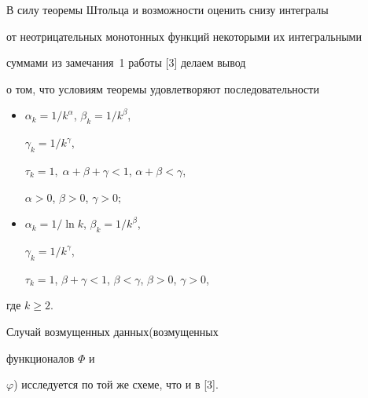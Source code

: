 \begin{note}


В силу теоремы Штольца и возможности оценить снизу интегралы


от не\-отрицательных монотонных функций некоторыми их интегральными


суммами из замечания~1 работы [3] делаем вывод


о том, что условиям теоремы удовлетворяют последовательности


\begin{itemize}


\item[а)] $\alpha_k=1/k^{\alpha }$, $\beta_k=1/k^{\beta }$,


$\gamma_k=1/k^{\gamma }$,


$\tau_k=1,\;\alpha +\beta +\gamma <1$, $\alpha +\beta <\gamma$, 


$\alpha >0$, $\beta >0$, $\gamma >0;$


\item[б)] $\alpha_k=1/\ln k$, $\beta_k=1/k^{\beta }$,


$\gamma_k=1/k^{\gamma }$,


$\tau_k=1$, $\beta +\gamma <1$, $\beta <\gamma$, $\beta >0$, $\gamma >0$,


\end{itemize}


где $k\geq 2$.


\end{note}





\begin{note}


Случай возмущенных данных(возмущенных


функционалов $\Phi $ и


$\varphi $) исследуется по той же схеме, что и в [3].


\end{note}





